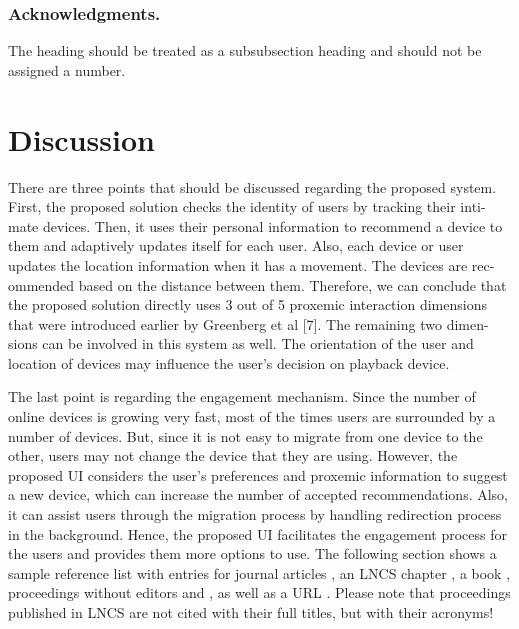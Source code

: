 \documentclass[runningheads,a4paper]{llncs}
\begin{document}
\subsubsection*{Acknowledgments.} The heading should be treated as a
subsubsection heading and should not be assigned a number.

\section{Discussion}

There are three points that should be discussed regarding the proposed system.
First, the proposed solution checks the identity of users by tracking their inti-
mate devices. Then, it uses their personal information to recommend a device
to them and adaptively updates itself for each user. Also, each device or user
updates the location information when it has a movement. The devices are rec-
ommended based on the distance between them. Therefore, we can conclude that
the proposed solution directly uses 3 out of 5 proxemic interaction dimensions
that were introduced earlier by Greenberg et al [7]. The remaining two dimen-
sions can be involved in this system as well. The orientation of the user and
location of devices may influence the user’s decision on playback device.

The last point is regarding the engagement mechanism. Since the number
of online devices is growing very fast, most of the times users are surrounded
by a number of devices. But, since it is not easy to migrate from one device to
the other, users may not change the device that they are using. However, the
proposed UI considers the user’s preferences and proxemic information to suggest
a new device, which can increase the number of accepted recommendations. Also,
it can assist users through the migration process by handling redirection process
in the background. Hence, the proposed UI facilitates the engagement process
for the users and provides them more options to use.
The following section shows a sample reference list with entries for
journal articles \cite{jour}, an LNCS chapter \cite{lncschap}, a book
\cite{book}, proceedings without editors \cite{proceeding1} and
\cite{proceeding2}, as well as a URL \cite{url}.
Please note that proceedings published in LNCS are not cited with their
full titles, but with their acronyms!
\end{document}
